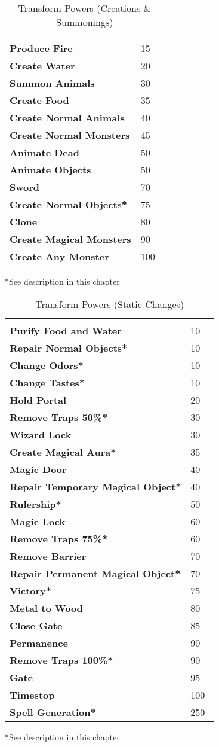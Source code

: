 \begin{multicols*}{2}
\begin {table}[H]
  \caption{Transform Powers (Creations \& Summonings)}
  \begin{tabularx}{\columnwidth}{>{\bfseries}YY}
   & \\
	Produce Fire & 15\\
	Create Water & 20\\
	Summon Animals & 30\\
	Create Food & 35\\
	Create Normal Animals & 40\\
	Create Normal Monsters & 45\\
	Animate Dead & 50\\
	Animate Objects & 50\\
	Sword & 70\\
	Create Normal Objects* & 75\\
	Clone & 80\\
	Create Magical Monsters & 90\\
	Create Any Monster & 100\
  \end {tabularx}
	*See description in this chapter
\end {table}

\begin {table}[H]
  \caption{Transform Powers (Static Changes)}
  \begin{tabularx}{\columnwidth}{>{\bfseries}YY}
   & \\
	Purify Food and Water & 10\\
	Repair Normal Objects* & 10\\
	Change Odors* & 10\\
	Change Tastes* & 10\\
	Hold Portal & 20\\
	Remove Traps 50\%* & 30\\
	Wizard Lock & 30\\
	Create Magical Aura* & 35\\
	Magic Door & 40\\
	Repair Temporary Magical Object* & 40\\
	Rulership* & 50\\
	Magic Lock & 60\\
	Remove Traps 75\%* & 60\\
	Remove Barrier & 70\\
	Repair Permanent Magical Object* & 70\\
	Victory* & 75\\
	Metal to Wood & 80\\
	Close Gate & 85\\
	Permanence & 90\\
	Remove Traps 100\%* & 90\\
	Gate & 95\\
	Timestop & 100\\
	Spell Generation* & 250\
  \end {tabularx}
	*See description in this chapter
\end {table}


\end{multicols*}
